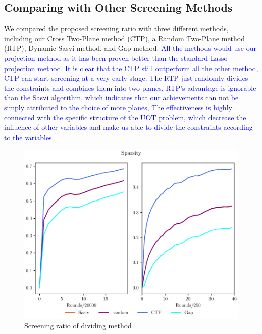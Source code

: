 \documentclass[twoside]{article}
\theoremstyle{plain}
\newcommand{\changeXS}[1]{\textcolor{blue}{#1}}
\begin{document}
%
%


\subsection{Comparing with Other Screening Methods}
We compared the proposed screening ratio with three different methods, including our Cross Two-Plane method (CTP), a Random Two-Plane method (RTP), Dynamic Sasvi method, and Gap method. \changeXS{All the methods would use our projection method as it has been proven better than the standard Lasso projection method. It is clear that the CTP still outperform all the other method, CTP can start screening at a very early stage. The RTP just randomly divides the constraints and combines them into two planes, RTP's advantage is ignorable than the Sasvi algorithm, which indicates that our achievements can not be simply attributed to the choice of more planes, The effectiveness is highly connected with the specific structure of the UOT problem, which decrease the influence of other variables and make us able to divide the constraints according to the variables.}
\begin{figure}[h]
\begin{center}
\includegraphics[width = \linewidth]{pic/ex_2}
\caption{Screening ratio of dividing method}
\end{center}
\end{figure}
\end{document}
